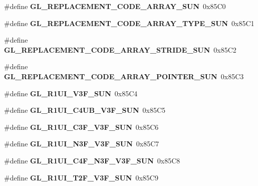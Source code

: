 \begin{DoxyCompactItemize}
\item 
\#define {\bfseries G\+L\+\_\+\+R\+E\+P\+L\+A\+C\+E\+M\+E\+N\+T\+\_\+\+C\+O\+D\+E\+\_\+\+A\+R\+R\+A\+Y\+\_\+\+S\+U\+N}~0x85\+C0\label{_s_d_l__opengl_8h_a14d1788c9ec11b7a574a4d8c5731330e}

\item 
\#define {\bfseries G\+L\+\_\+\+R\+E\+P\+L\+A\+C\+E\+M\+E\+N\+T\+\_\+\+C\+O\+D\+E\+\_\+\+A\+R\+R\+A\+Y\+\_\+\+T\+Y\+P\+E\+\_\+\+S\+U\+N}~0x85\+C1\label{_s_d_l__opengl_8h_ae7e225c487eff1fd0780eda26fa7fe62}

\item 
\#define {\bfseries G\+L\+\_\+\+R\+E\+P\+L\+A\+C\+E\+M\+E\+N\+T\+\_\+\+C\+O\+D\+E\+\_\+\+A\+R\+R\+A\+Y\+\_\+\+S\+T\+R\+I\+D\+E\+\_\+\+S\+U\+N}~0x85\+C2\label{_s_d_l__opengl_8h_a4bc0c40015f2bdd737ced009d55a1400}

\item 
\#define {\bfseries G\+L\+\_\+\+R\+E\+P\+L\+A\+C\+E\+M\+E\+N\+T\+\_\+\+C\+O\+D\+E\+\_\+\+A\+R\+R\+A\+Y\+\_\+\+P\+O\+I\+N\+T\+E\+R\+\_\+\+S\+U\+N}~0x85\+C3\label{_s_d_l__opengl_8h_ac5c1c0e6709232af0d5c92d68a815ff9}

\item 
\#define {\bfseries G\+L\+\_\+\+R1\+U\+I\+\_\+\+V3\+F\+\_\+\+S\+U\+N}~0x85\+C4\label{_s_d_l__opengl_8h_a66a6e6ad58351a3a94adac8ef7c3cc61}

\item 
\#define {\bfseries G\+L\+\_\+\+R1\+U\+I\+\_\+\+C4\+U\+B\+\_\+\+V3\+F\+\_\+\+S\+U\+N}~0x85\+C5\label{_s_d_l__opengl_8h_a263fbe91093608f1e41eef4a07070cad}

\item 
\#define {\bfseries G\+L\+\_\+\+R1\+U\+I\+\_\+\+C3\+F\+\_\+\+V3\+F\+\_\+\+S\+U\+N}~0x85\+C6\label{_s_d_l__opengl_8h_a10f0bd4a6c946eafff21d39f095fae84}

\item 
\#define {\bfseries G\+L\+\_\+\+R1\+U\+I\+\_\+\+N3\+F\+\_\+\+V3\+F\+\_\+\+S\+U\+N}~0x85\+C7\label{_s_d_l__opengl_8h_ad1f88853e5a89661d5852be2da6e4fb7}

\item 
\#define {\bfseries G\+L\+\_\+\+R1\+U\+I\+\_\+\+C4\+F\+\_\+\+N3\+F\+\_\+\+V3\+F\+\_\+\+S\+U\+N}~0x85\+C8\label{_s_d_l__opengl_8h_a12fd57a92127439db08883b93cff28a1}

\item 
\#define {\bfseries G\+L\+\_\+\+R1\+U\+I\+\_\+\+T2\+F\+\_\+\+V3\+F\+\_\+\+S\+U\+N}~0x85\+C9\label{_s_d_l__opengl_8h_aae72bd86a941cb43f97bb98a01e47c36}


\end{DoxyCompactItemize}
